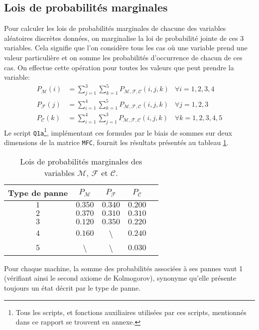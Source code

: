 \documentclass[a4paper, 12pt]{article}
\newcommand{\M}{\mathcal{M}}
\newcommand{\F}{\mathcal{F}}
\newcommand{\C}{\mathcal{C}}
\begin{document}
	\subsection{Lois de probabilités marginales}
	\label{sec:prob_marg}
	Pour calculer les lois de probabilités marginales de chacune des variables aléatoires discrètes données, on marginalise la loi de probabilité jointe de ces 3 variables. Cela signifie que l'on considère tous les cas où une variable prend une valeur particulière et on somme les probabilités d'occurrence de chacun de ces cas. On effectue cette opération pour toutes les valeurs que peut prendre la variable:
	\begin{align*}
	    P_\M\left(i\right) &= \sum_{j=1}^{3}\sum_{k=1}^{5}P_{\M,\F,\C}\left(i,j,k\right) & \forall i=1,2,3,4\\
	    P_\F\left(j\right) &= \sum_{i=1}^{4}\sum_{k=1}^{5}P_{\M,\F,\C}\left(i,j,k\right) & \forall j=1,2,3\\
	    P_\C\left(k\right) &= \sum_{i=1}^{4}\sum_{j=1}^{3}P_{\M,\F,\C}\left(i,j,k\right) & \forall k=1,2,3,4,5
	\end{align*}
	Le script \texttt{Q1a}\footnote{Tous les scripts, et fonctions auxiliaires utilisées par ces scripts, mentionnés dans ce rapport se trouvent en annexe.}, implémentant ces formules par le biais de sommes sur deux dimensions de la matrice \texttt{MFC}, fournit les résultats présentés au tableau \ref{tab:tab_Q1a}.\par
	\begin{table}[!ht]
	    \centering
	    \begin{tabular}{|c|c|c|c|c|}
            \hline
            \textbf{Type de panne} & \(P_\M\) & \(P_\F\) & \(P_\C\)\\
            \hline
            \hline
            \(1\) & \(\num{0,350}\) & \(\num{0,340}\) & \(\num{0,200}\)\\
            \hline
            \(2\) & \(\num{0,370}\) & \(\num{0,310}\) & \(\num{0,310}\)\\
            \hline
            \(3\) & \(\num{0,120}\) & \(\num{0,350}\) & \(\num{0,220}\)\\
            \hline
            \(4\) & \(\num{0,160}\) & \textbackslash & \(\num{0,240}\)\\
            \hline
            \(5\) & \textbackslash & \textbackslash & \(\num{0,030}\)\\
            \hline
        \end{tabular}
        \caption{Lois de probabilités marginales des variables \(\M\), \(\F\) et \(\C\).}
        \label{tab:tab_Q1a}
    \end{table}
    Pour chaque machine, la somme des probabilités associées à ses pannes vaut 1 (vérifiant ainsi le second axiome de Kolmogorov), synonyme qu'elle présente toujours un état décrit par le type de panne.
\end{document}
